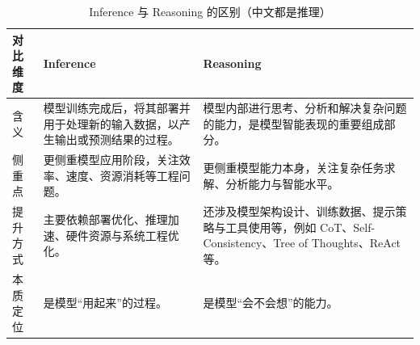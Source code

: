 \documentclass[../main.tex]{subfiles}
\begin{document}
\begin{table}[H]
    \centering
    \caption{Inference 与 Reasoning 的区别（中文都是推理）}
    \begin{tabular}{p{2.4cm}p{5.8cm}p{5.8cm}}
        \toprule
        对比维度 & Inference & Reasoning \\
        \midrule
        含义 & 模型训练完成后，将其部署并用于处理新的输入数据，以产生输出或预测结果的过程。 & 模型内部进行思考、分析和解决复杂问题的能力，是模型智能表现的重要组成部分。 \\
        侧重点 & 更侧重模型应用阶段，关注效率、速度、资源消耗等工程问题。 & 更侧重模型能力本身，关注复杂任务求解、分析能力与智能水平。 \\
        提升方式 & 主要依赖部署优化、推理加速、硬件资源与系统工程优化。 & 还涉及模型架构设计、训练数据、提示策略与工具使用等，例如 CoT、Self-Consistency、Tree of Thoughts、ReAct 等。 \\
        本质定位 & 是模型“用起来”的过程。 & 是模型“会不会想”的能力。 \\
        \bottomrule
    \end{tabular}
\end{table}
\end{document}
